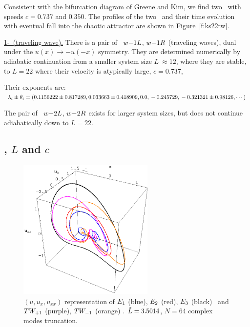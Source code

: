Consistent with the bifurcation diagram of Greene and Kim,
we find two \reqva\ with speeds $c = 0.737$ and $0.350$.
The profiles of the two \reqva\ and their time evolution
with eventual fall into the chaotic attractor are
shown in Figure~\ref{f:ks22tw}.


\underline{1-\reqv\  (traveling wave).}
There is a pair of \reqva\
${w-}1L$,
${w-}1R$
(traveling waves), dual under the
$u(x) \to -u(-x)$ symmetry. They are
determined numerically by
adiabatic continuation from a smaller system size
$L~\approx 12$,
where they are stable, to $L=22$
where their velocity is atypically large, $c=0.737$,

Their exponents are:
\\
$\lambda_i \pm \theta_i =
(
\\
  0.1156222 \pm 0.817289,   \\
  0.033663 \pm 0.418909,    \\
 0.0                    ,   \\
 -0.245729                    , \\
 -0.321321 \pm 0.98126,
\cdots
)$

The pair of \reqva\
${w-}2L$,
${w-}2R$
exists for larger system sizes, but does not continue
adiabatically down to $L=22$.


\subsection{\Eqva, $L$ and $c$}

\begin{figure}[t]
\centering
\includegraphics[width=0.6\textwidth]{figs/equilSpatial.eps}
\caption{
    {\small
$(u,u_x,u_{xx})$ representation
of $E_{1}$ (blue), $E_{2}$ (red), $E_{3}$ (black) \eqva\ and $TW_{+1}$ (purple), $TW_{-1}$ (orange) \reqva.
$\tilde{L}=3.5014$, $N=64$ complex modes truncation.
        } %
        }
\label{f:eqvSpatial}
\end{figure}

